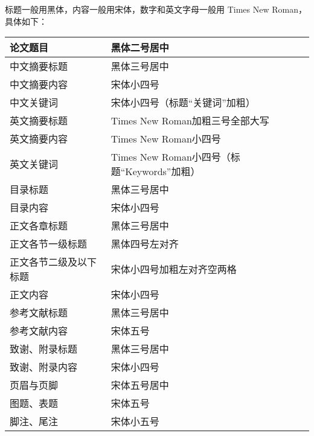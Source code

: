 标题一般用黑体，内容一般用宋体，数字和英文字母一般用 Times New Roman，具体如下：

\begin{center}
    \begin{tabular}{|l|l|}
        \hline
        论文题目        & 黑体二号居中                             \\
        \hline
        中文摘要标题      & 黑体三号居中                             \\
        \hline
        中文摘要内容      & 宋体小四号                              \\
        \hline
        中文关键词       & 宋体小四号（标题“关键词”加粗）                   \\
        \hline
        英文摘要标题      & Times New Roman加粗三号全部大写            \\
        \hline
        英文摘要内容      & Times New Roman小四号                 \\
        \hline
        英文关键词       & Times New Roman小四号（标题“Keywords”加粗） \\
        \hline
        目录标题        & 黑体三号居中                             \\
        \hline
        目录内容        & 宋体小四号                              \\
        \hline
        正文各章标题      & 黑体三号居中                             \\
        \hline
        正文各节一级标题    & 黑体四号左对齐                            \\
        \hline
        正文各节二级及以下标题 & 宋体小四号加粗左对齐空两格                      \\
        \hline
        正文内容        & 宋体小四号                              \\
        \hline
        参考文献标题      & 黑体三号居中                             \\
        \hline
        参考文献内容      & 宋体五号                               \\
        \hline
        致谢、附录标题     & 黑体三号居中                             \\
        \hline
        致谢、附录内容     & 宋体小四号                              \\
        \hline
        页眉与页脚       & 宋体五号居中                             \\
        \hline
        图题、表题       & 宋体五号                               \\
        \hline
        脚注、尾注       & 宋体小五号                              \\
        \hline
    \end{tabular}
\end{center}

